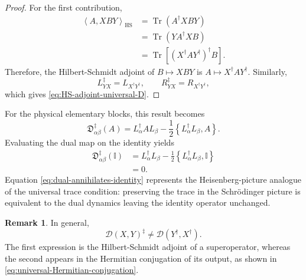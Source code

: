 \documentclass[notitlepage,aip,reprint,onecolumn]{revtex4-1}
\theoremstyle{definition}
\newtheorem{remark}[theorem]{Remark}
\begin{document}
\begin{proof}
For the first contribution,
\begin{align*}
    \left\langle
    A,XBY
    \right\rangle_{\mathrm{HS}}
    &=
    \operatorname{Tr}
    \left(
    A^\dagger XBY
    \right)
    \\
    &=
    \operatorname{Tr}
    \left(
    YA^\dagger XB
    \right)
    \\
    &=
    \operatorname{Tr}
    \left[
    \left(
    X^\dagger A Y^\dagger
    \right)^\dagger
    B
    \right].
\end{align*}
Therefore, the Hilbert-Schmidt adjoint of \(B\mapsto XBY\) is \(A\mapsto X^\dagger A Y^\dagger\). Similarly,
\[
    L_{YX}^\ddagger
    =
    L_{X^\dagger Y^\dagger},
    \qquad
    R_{YX}^\ddagger
    =
    R_{X^\dagger Y^\dagger},
\]
which gives \eqref{eq:HS-adjoint-universal-D}.
\end{proof}

For the physical elementary blocks, this result becomes
\begin{equation}\label{eq:HS-adjoint-physical-D}
    \mathfrak{D}_{\alpha\beta}^\ddagger(A)
    =
    L_\alpha^\dagger A L_\beta
    -
    \frac12
    \left\{
    L_\alpha^\dagger L_\beta,A
    \right\}.
\end{equation}
Evaluating the dual map on the identity yields
\begin{align}
    \mathfrak{D}_{\alpha\beta}^\ddagger(\mathbb I)
    &=
    L_\alpha^\dagger L_\beta
    -
    \frac12
    \left\{
    L_\alpha^\dagger L_\beta,\mathbb I
    \right\}
    \nonumber\\
    &=
    0.
\label{eq:dual-annihilates-identity}
\end{align}
Equation \eqref{eq:dual-annihilates-identity} represents the Heisenberg-picture analogue of the universal trace condition: preserving the trace in the Schrödinger picture is equivalent to the dual dynamics leaving the identity operator unchanged.

\begin{remark}
In general,
\[
    \mathcal D(X,Y)^\ddagger
    \neq
    \mathcal D(Y^\dagger,X^\dagger).
\]
The first expression is the Hilbert-Schmidt adjoint of a superoperator, whereas the second appears in the Hermitian conjugation of its output, as shown in \eqref{eq:universal-Hermitian-conjugation}.
\end{remark}

\end{document}

